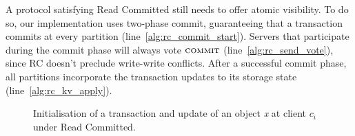 A protocol satisfying Read Committed still needs to offer atomic visibility. To do so, our implementation uses two-phase commit, guaranteeing that a transaction commits at every partition (line~\ref{alg:rc_commit_start}). Servers that participate during the commit phase will always vote $\text{\sc commit}$ (line~\ref{alg:rc_send_vote}), since RC doesn't preclude write-write conflicts. After a successful commit phase, all partitions incorporate the transaction updates to its storage state (line~\ref{alg:rc_kv_apply}).

\begin{figure}[h]
\begin{algorithm}[H]
  \setcounter{AlgoLine}{0}

  \smallskip

\end{algorithm}
\caption{Initialisation of a transaction and update of an object \emph{x} at client $c_i$ under Read Committed.}
\end{figure}

